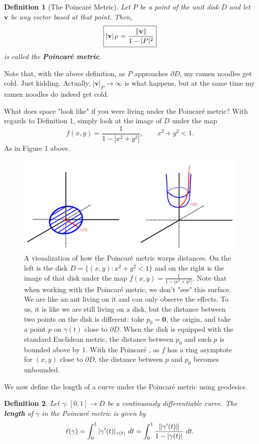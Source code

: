 \documentclass[10pt]{article}
\theoremstyle{plain}
\newtheorem{definition}{Definition}
\begin{document}
	\begin{definition}[The Poincaré Metric]
		Let $P$ be a point of the unit disk $D$ and let $\mathbf{v}$ be any vector based at that point. Then, $$\boxed{|\mathbf{v}|_P = \frac{\norm{\mathbf{v}}}{1 - |P|^2}}$$ is called the \textbf{\textit{Poincaré metric}}. 
	\end{definition}

	\noindent Note that, with the above definition, as $P$ approaches $\partial D$, my ramen noodles get cold. Just kidding. Actually, $|\mathbf{v}|_P \to \infty$ is what happens, but at the same time my ramen noodles do indeed get cold.
	
	
	What does space "look like" if you were living under the Poincaré metric? With regards to Definition 1, simply look at the image of $D$ under the map $$f(x, y) = \frac{1}{1 - |x^2 + y^2|}, \qquad x^2 + y^2 < 1.$$ As in Figure 1 above. 
	
		\begin{figure}
			\centering
			\includegraphics[scale = 0.25]{images/pcmetric.JPG}
			\caption{\small{A visualization of how the Poincaré metric warps distances. On the left is the disk $D = \{(x, y) : x^2 + y^2 < 1\}$ and on the right is the image of that disk under the map $f(x, y) = \frac{1}{1 - |x^2 + y^2|}.$ Note that when working with the Poincaré metric, we don't "see" this surface. We are like an ant living on it and can only observe the effects. To us, it is like we are still living on a disk, but the distance between two points on the disk is different: take $p_0 = \mathbf{0}$, the origin, and take a point $p$ on $\gamma(t)$ close to $\partial D$. When the disk is equipped with the standard Euclidean metric, the distance between $p_0$ and such $p$ is bounded above by 1. With the Poincaré , as $f$ has a ring asymptote for $(x, y)$ close to $\partial D$, the distance between $p$ and $p_0$ becomes unbounded.}} 
		\end{figure}
	We now define the length of a curve under the Poincaré metric using geodesics. 
		\begin{definition}
			Let $\gamma: [0, 1] \to D$ be a continuously differentiable curve. The \textbf{\textit{length}} of $\gamma$ in the Poincaré metric is given by $$\ell(\gamma) = \int_0^1 |\gamma'(t)|_{\gamma(t)} \ dt = \int_0^1 \frac{\norm{\gamma'(t)}}{1 - |\gamma(t)|} \ dt.$$ 
		\end{definition} 
	
	
\end{document}
